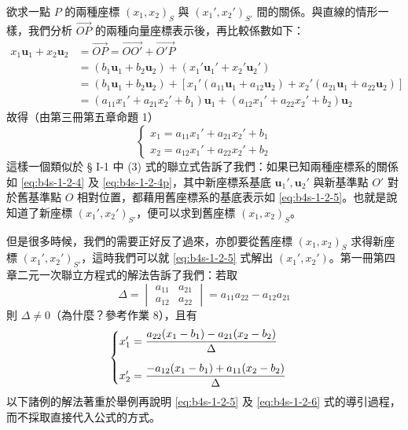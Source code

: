 欲求一點 $P$ 的兩種座標 $(x_1, x_2)_S$ 與 $(x_1', x_2')_{S'}$ 間的關係。與直線的情形一樣，我們分析 $\vec{OP}$ 的兩種向量座標表示後，再比較係數如下：
\begin{align*}
x_1 \mathbf{u}_1 + x_2 \mathbf{u}_2 &= \vec{OP} = \vec{OO'} + \vec{O'P} \\
&= (b_1 \mathbf{u}_1 + b_2 \mathbf{u}_2) + (x_1' \mathbf{u}_1' + x_2' \mathbf{u}_2') \\
&= (b_1 \mathbf{u}_1 + b_2 \mathbf{u}_2) + [x_1' (a_{11}\mathbf{u}_1 + a_{12}\mathbf{u}_2) + x_2' (a_{21}\mathbf{u}_1 + a_{22}\mathbf{u}_2)] \\
&= (a_{11}x_1' + a_{21}x_2' + b_1)\mathbf{u}_1 + (a_{12}x_1' + a_{22}x_2' + b_2)\mathbf{u}_2
\end{align*}
故得（由第三冊第五章命題 1）
\begin{equation}
\begin{cases}
x_1 = a_{11} x_1' + a_{21} x_2' + b_1 \\
x_2 = a_{12} x_1' + a_{22} x_2' + b_2
\end{cases} \label{eq:b4s-1-2-5}
\end{equation}
這樣一個類似於 § I-1 中 (3) 式的聯立式告訴了我們：如果已知兩種座標系的關係如 \eqref{eq:b4s-1-2-4} 及 \eqref{eq:b4s-1-2-4p}，其中新座標系基底 $\mathbf{u}_1', \mathbf{u}_2'$ 與新基準點 $O'$ 對於舊基準點 $O$ 相對位置，都藉用舊座標系的基底表示如 \eqref{eq:b4s-1-2-5}。也就是說知道了新座標 $(x_1', x_2')_{S'}$，便可以求到舊座標 $(x_1, x_2)_S$。

但是很多時候，我們的需要正好反了過來，亦卽要從舊座標 $(x_1, x_2)_S$ 求得新座標 $(x_1', x_2')_{S'}$，這時我們可以就 \eqref{eq:b4s-1-2-5} 式解出 $(x_1', x_2')$。第一冊第四章二元一次聯立方程式的解法告訴了我們：若取
\[ \Delta = \begin{vmatrix} a_{11} & a_{21} \\ a_{12} & a_{22} \end{vmatrix} = a_{11}a_{22} - a_{12}a_{21} \]
則 $\Delta \neq 0$（為什麼？參考作業 8），且有
\begin{equation}
\begin{cases}
x_1' = \dfrac{a_{22}(x_1 - b_1) - a_{21}(x_2 - b_2)}{\Delta} \\ \noalign{\vskip 1em}
x_2' = \dfrac{-a_{12}(x_1 - b_1) + a_{11}(x_2 - b_2)}{\Delta}
\end{cases} \label{eq:b4s-1-2-6}
\end{equation}
以下諸例的解法著重於舉例再說明 \eqref{eq:b4s-1-2-5} 及 \eqref{eq:b4s-1-2-6} 式的導引過程，而不採取直接代入公式的方式。

